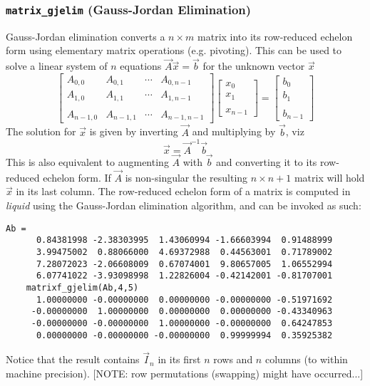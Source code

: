 \subsubsection{{\tt matrix\_gjelim} (Gauss-Jordan Elimination)}
\label{module:matrix:gjelim}
Gauss-Jordan elimination converts a $n \times m$ matrix into its row-reduced
echelon form using elementary matrix operations (e.g. pivoting).
This can be used to solve a linear system of $n$ equations
$\vec{A}\vec{x} = \vec{b}$ for the unknown vector $\vec{x}$
\[
    \begin{bmatrix}
        A_{0,0}     & A_{0,1}   & \cdots  & A_{0,n-1} \\
        A_{1,0}     & A_{1,1}   & \cdots  & A_{1,n-1} \\
        \\
        A_{n-1,0}   & A_{n-1,1} & \cdots  & A_{n-1,n-1}
    \end{bmatrix}
    \begin{bmatrix}
        x_{0} \\
        x_{1} \\
        \\
        x_{n-1}
    \end{bmatrix}
    =
    \begin{bmatrix}
        b_{0} \\
        b_{1} \\
        \\
        b_{n-1}
    \end{bmatrix}
\]
The solution for $\vec{x}$ is given by inverting $\vec{A}$ and multiplying
by $\vec{b}$, viz
\[
    \vec{x} = \vec{A}^{-1}\vec{b}
\]
This is also equivalent to augmenting $\vec{A}$ with $\vec{b}$ and
converting it to its row-reduced echelon form.
If $\vec{A}$ is non-singular the resulting $n \times n+1$ matrix will hold
$\vec{x}$ in its last column.
The row-reduced echelon form of a matrix is computed in {\it liquid} using the
Gauss-Jordan elimination algorithm, and can be invoked as such:
\begin{Verbatim}[fontsize=\small]
    Ab =
      0.84381998 -2.38303995  1.43060994 -1.66603994  0.91488999
      3.99475002  0.88066000  4.69372988  0.44563001  0.71789002
      7.28072023 -2.06608009  0.67074001  9.80657005  1.06552994
      6.07741022 -3.93098998  1.22826004 -0.42142001 -0.81707001
    matrixf_gjelim(Ab,4,5)
      1.00000000 -0.00000000  0.00000000 -0.00000000 -0.51971692
     -0.00000000  1.00000000  0.00000000  0.00000000 -0.43340963
     -0.00000000 -0.00000000  1.00000000 -0.00000000  0.64247853
      0.00000000 -0.00000000 -0.00000000  0.99999994  0.35925382
\end{Verbatim}
Notice that the result contains $\vec{I}_n$ in its first $n$ rows and $n$
columns (to within machine precision).
[NOTE: row permutations (swapping) might have occurred...]

